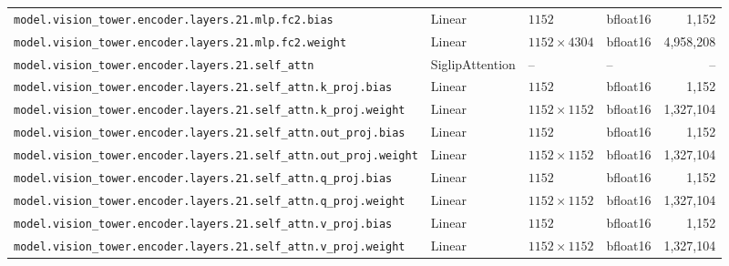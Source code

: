 \documentclass[10pt,a4paper]{article}
\theoremstyle{definition}
\begin{document}
\begin{appendices}
{\begin{longtable}{p{6.8cm}>{\raggedright\arraybackslash}p{3.3cm}llr}
\texttt{model.\allowbreak{}vision\_tower.\allowbreak{}encoder.\allowbreak{}layers.\allowbreak{}21.\allowbreak{}mlp.\allowbreak{}fc2.\allowbreak{}bias} & Linear & $1152$ & bfloat16 & 1,152 \\
\texttt{model.\allowbreak{}vision\_tower.\allowbreak{}encoder.\allowbreak{}layers.\allowbreak{}21.\allowbreak{}mlp.\allowbreak{}fc2.\allowbreak{}weight} & Linear & $1152 \times 4304$ & bfloat16 & 4,958,208 \\
\texttt{model.\allowbreak{}vision\_tower.\allowbreak{}encoder.\allowbreak{}layers.\allowbreak{}21.\allowbreak{}self\_attn} & Siglip\allowbreak{}Attention & -- & -- & -- \\
\texttt{model.\allowbreak{}vision\_tower.\allowbreak{}encoder.\allowbreak{}layers.\allowbreak{}21.\allowbreak{}self\_attn.\allowbreak{}k\_proj.\allowbreak{}bias} & Linear & $1152$ & bfloat16 & 1,152 \\
\texttt{model.\allowbreak{}vision\_tower.\allowbreak{}encoder.\allowbreak{}layers.\allowbreak{}21.\allowbreak{}self\_attn.\allowbreak{}k\_proj.\allowbreak{}weight} & Linear & $1152 \times 1152$ & bfloat16 & 1,327,104 \\
\texttt{model.\allowbreak{}vision\_tower.\allowbreak{}encoder.\allowbreak{}layers.\allowbreak{}21.\allowbreak{}self\_attn.\allowbreak{}out\_proj.\allowbreak{}bias} & Linear & $1152$ & bfloat16 & 1,152 \\
\texttt{model.\allowbreak{}vision\_tower.\allowbreak{}encoder.\allowbreak{}layers.\allowbreak{}21.\allowbreak{}self\_attn.\allowbreak{}out\_proj.\allowbreak{}weight} & Linear & $1152 \times 1152$ & bfloat16 & 1,327,104 \\
\texttt{model.\allowbreak{}vision\_tower.\allowbreak{}encoder.\allowbreak{}layers.\allowbreak{}21.\allowbreak{}self\_attn.\allowbreak{}q\_proj.\allowbreak{}bias} & Linear & $1152$ & bfloat16 & 1,152 \\
\texttt{model.\allowbreak{}vision\_tower.\allowbreak{}encoder.\allowbreak{}layers.\allowbreak{}21.\allowbreak{}self\_attn.\allowbreak{}q\_proj.\allowbreak{}weight} & Linear & $1152 \times 1152$ & bfloat16 & 1,327,104 \\
\texttt{model.\allowbreak{}vision\_tower.\allowbreak{}encoder.\allowbreak{}layers.\allowbreak{}21.\allowbreak{}self\_attn.\allowbreak{}v\_proj.\allowbreak{}bias} & Linear & $1152$ & bfloat16 & 1,152 \\
\texttt{model.\allowbreak{}vision\_tower.\allowbreak{}encoder.\allowbreak{}layers.\allowbreak{}21.\allowbreak{}self\_attn.\allowbreak{}v\_proj.\allowbreak{}weight} & Linear & $1152 \times 1152$ & bfloat16 & 1,327,104 \\

\end{longtable}}
\end{appendices}
\end{document}
